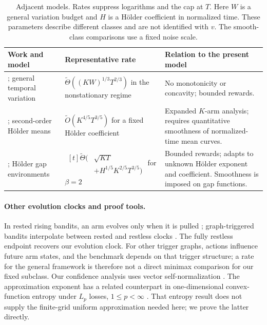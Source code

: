 \documentclass[11pt]{article}
\theoremstyle{remark}
\begin{document}
\begin{table}[t]
\centering
\caption{Adjacent models. Rates suppress logarithms and the cap at $T$.
Here $W$ is a general variation budget and $H$ is a H\"older coefficient in
normalized time. These parameters describe different classes and are not
identified with $v$. The smooth-class comparisons use a fixed noise scale.}
\label{tab:adjacent-comparison}
\small
\setlength{\tabcolsep}{4pt}
\renewcommand{\arraystretch}{1.2}
\begin{tabularx}{\textwidth}{@{}P{0.24\textwidth}P{0.34\textwidth}Y@{}}
\toprule
Work and model & Representative rate & Relation to the present model \\
\midrule
\citet{besbes2014nonstationary}; general temporal variation
& $\widetilde\Theta\!\left((KW)^{1/3}T^{2/3}\right)$ in the nonstationary regime
& No monotonicity or concavity; bounded rewards. \\
\addlinespace
\citet{jia2023smooth,jia2024smooth}; second-order H\"older means
& $\widetilde O\!\left(K^{4/5}T^{3/5}\right)$ for a fixed H\"older coefficient
& Expanded $K$-arm analysis; requires quantitative smoothness of normalized-time mean curves. \\
\addlinespace
\citet{suk2025adaptive}; H\"older gap environments
& $\begin{aligned}[t]
\widetilde\Theta\bigl(&\sqrt{KT}\\
&+H^{1/5}K^{2/5}T^{3/5}\bigr)
\end{aligned}$ for $\beta=2$
& Bounded rewards; adapts to unknown H\"older exponent and coefficient. Smoothness is imposed on gap functions. \\
\bottomrule
\end{tabularx}
\end{table}

\paragraph{Other evolution clocks and proof tools.}
In rested rising bandits, an arm evolves only when it is pulled
\citep{metelli2022stochastic}; graph-triggered bandits interpolate between
rested and restless clocks \citep{genalti2024graph}. The fully restless
endpoint recovers our evolution clock. For other trigger graphs, actions
influence future arm states, and the benchmark depends on that trigger
structure; a rate for the general framework is therefore not a direct
minimax comparison for our fixed subclass.
Our confidence analysis uses vector self-normalization
\citep{abbasi2011improved}. The approximation exponent has a related
counterpart in one-dimensional convex-function entropy under $L_p$ losses,
$1\le p<\infty$ \citep{guntuboyina2013covering}. That entropy result does not
supply the finite-grid uniform approximation needed here; we prove the latter
directly.
\end{document}
